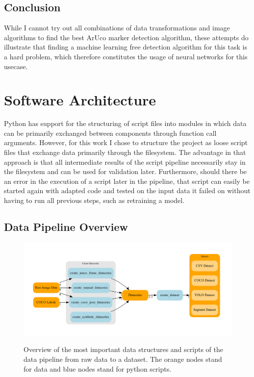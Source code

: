 \documentclass[10pt]{book}
\begin{document}
\subsection{Conclusion}

While I cannot try out all combinations of data transformations and image algorithms to find the best \ac{ArUco} marker detection algorithm, these attempts do illustrate that finding a machine learning free detection algorithm for this task is a hard problem, which therefore constitutes the usage of neural networks for this usecase.

\section{Software Architecture}

Python has support for the structuring of script files into modules in which data can be primarily exchanged between components through function call arguments. However, for this work I chose to structure the project as loose script files that exchange data primarily through the filesystem. The advantage in that approach is that all intermediate results of the script pipeline necessarily stay in the filesystem and can be used for validation later. Furthermore, should there be an error in the execution of a script later in the pipeline, that script can easily be started again with adapted code and tested on the input data it failed on without having to run all previous steps, such as retraining a model.

\subsection{Data Pipeline Overview}

\begin{figure}
  \caption{Overview of the most important data structures and scripts of the data pipeline from raw data to a dataset. The orange nodes stand for data and blue nodes stand for python scripts.}
  \includegraphics[width=\textwidth]{graph/arch_data}
  \label{fig:arch_data}
\end{figure}
\end{document}
